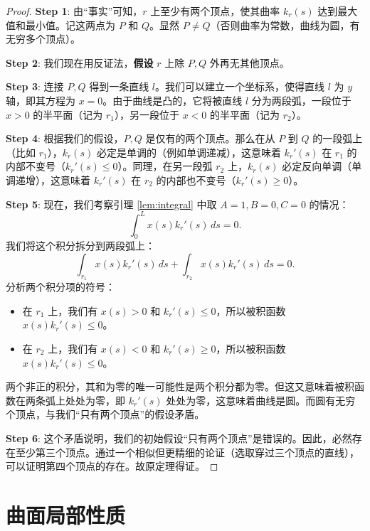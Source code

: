\documentclass[lang=cn,10pt,thmcnt=section]{elegantbook}
\begin{document}
\begin{proof}
    \textbf{Step 1}: 由“事实”可知，$r$ 上至少有两个顶点，使其曲率 $k_r(s)$ 达到最大值和最小值。记这两点为 $P$ 和 $Q$。显然 $P \neq Q$（否则曲率为常数，曲线为圆，有无穷多个顶点）。
    
    \textbf{Step 2}: 我们现在用反证法，\textbf{假设} $r$ 上除 $P, Q$ 外再无其他顶点。
    
    \textbf{Step 3}: 连接 $P, Q$ 得到一条直线 $l$。我们可以建立一个坐标系，使得直线 $l$ 为 $y$ 轴，即其方程为 $x=0$。由于曲线是凸的，它将被直线 $l$ 分为两段弧，一段位于 $x>0$ 的半平面（记为 $r_1$），另一段位于 $x<0$ 的半平面（记为 $r_2$）。
    
    \textbf{Step 4}: 根据我们的假设，$P, Q$ 是仅有的两个顶点。那么在从 $P$ 到 $Q$ 的一段弧上（比如 $r_1$），$k_r(s)$ 必定是单调的（例如单调递减），这意味着 $k_r'(s)$ 在 $r_1$ 的内部不变号（$k_r'(s) \le 0$）。同理，在另一段弧 $r_2$ 上，$k_r(s)$ 必定反向单调（单调递增），这意味着 $k_r'(s)$ 在 $r_2$ 的内部也不变号（$k_r'(s) \ge 0$）。
    
    \textbf{Step 5}: 现在，我们考察引理 \ref{lem:integral} 中取 $A=1, B=0, C=0$ 的情况：
    \[
    \int_0^{L} x(s) k_r'(s) \, ds = 0.
    \]
    我们将这个积分拆分到两段弧上：
    \[
    \int_{r_1} x(s) k_r'(s) \, ds + \int_{r_2} x(s) k_r'(s) \, ds = 0.
    \]
    分析两个积分项的符号：
    \begin{itemize}
        \item 在 $r_1$ 上，我们有 $x(s) > 0$ 和 $k_r'(s) \le 0$，所以被积函数 $x(s) k_r'(s) \le 0$。
        \item 在 $r_2$ 上，我们有 $x(s) < 0$ 和 $k_r'(s) \ge 0$，所以被积函数 $x(s) k_r'(s) \le 0$。
    \end{itemize}
    两个非正的积分，其和为零的唯一可能性是两个积分都为零。但这又意味着被积函数在两条弧上处处为零，即 $k_r'(s)$ 处处为零，这意味着曲线是圆。而圆有无穷个顶点，与我们“只有两个顶点”的假设矛盾。
    
    \textbf{Step 6}: 这个矛盾说明，我们的初始假设“只有两个顶点”是错误的。因此，必然存在至少第三个顶点。通过一个相似但更精细的论证（选取穿过三个顶点的直线），可以证明第四个顶点的存在。故原定理得证。
\end{proof}
\chapter{曲面局部性质}
\end{document}
